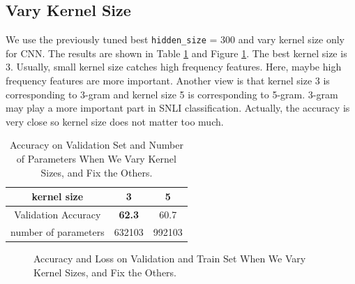 \documentclass[10pt,a4paper]{article}
\begin{document}
\subsection{Vary Kernel Size}
We use the previously tuned best \texttt{hidden\_size} = 300 and vary kernel size only for CNN. The results are shown in Table \ref{tab: kernel} and Figure \ref{fig: kernel}. The best kernel size is 3. Usually, small kernel size catches high frequency features. Here, maybe high frequency features are more important. Another view is that kernel size 3 is corresponding to 3-gram and kernel size 5 is corresponding to 5-gram. 3-gram may play a more important part in SNLI classification. Actually, the accuracy is very close so kernel size does not matter too much.
\begin{table}[!ht]
\centering
\begin{tabular}{|c|c|c|}
\hline
kernel size & 3 & 5\\ \hline
Validation Accuracy & \textbf{62.3} & 60.7\\ \hline
number of parameters & 632103 & 992103 \\ \hline
\end{tabular}
\caption{\label{tab: kernel}Accuracy on Validation Set and Number of Parameters When We Vary Kernel Sizes, and Fix the Others.}
\end{table}
\begin{figure}[!ht]
\centering
{}
\caption{\label{fig: kernel}Accuracy and Loss on Validation and Train Set When We Vary Kernel Sizes, and Fix the Others.}
\end{figure}
\end{document}
